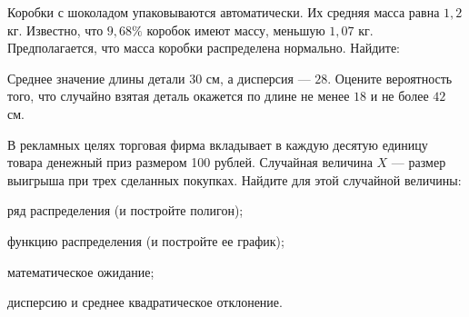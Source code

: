 \vfil

\begin{zkrPlain}{25}\noindent 
	Коробки с шоколадом упаковываются автоматически. Их средняя масса равна $1{,}2$ кг. Известно, что $9{,}68\%$ коробок имеют массу, меньшую $1{,}07$ кг. Предполагается, что масса коробки распределена нормально. Найдите: \par {}
 
\end{zkrPlain}

\vfil

\begin{zkrPlain}{25}\noindent 
	Среднее значение длины детали $ 30 $ см, а дисперсия --- $ 28 $. Оцените вероятность того, что случайно взятая деталь окажется по длине не менее $ 18 $ и не более $ 42 $ см.
 
\end{zkrPlain}

\newpage\setcounter{zad}{0}\setcounter{footnote}{0}



\begin{zkrPlain}{25}\noindent 
		В рекламных целях торговая фирма вкладывает в каждую десятую единицу товара денежный приз размером 100 рублей. Случайная величина $X$ --- размер выигрыша при трех сделанных покупках.  Найдите для этой случайной величины: \par \smallskip\small{ \par \zz ряд распределения (и постройте полигон); \par \zz функцию распределения (и постройте ее график); \par \zz математическое ожидание; \par \zz дисперсию и среднее квадратическое отклонение.\par \par}
 
\end{zkrPlain}

\vfil

